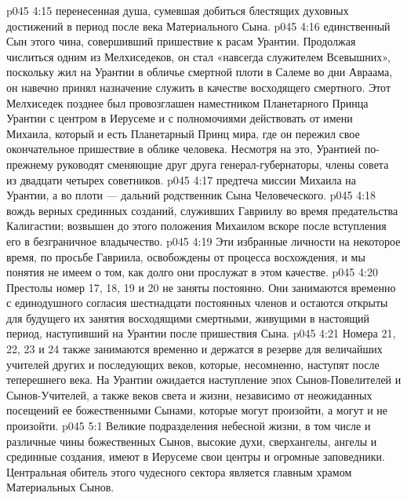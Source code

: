 \vs p045 4:15 \pc {}\bibnobreakspace {} перенесенная душа, сумевшая добиться блестящих духовных достижений в период после века Материального Сына.
\vs p045 4:16 \pc {}\bibnobreakspace {} единственный Сын этого чина, совершивший пришествие к расам Урантии. Продолжая числиться одним из Мелхиседеков, он стал «навсегда служителем Всевышних», поскольку жил на Урантии в обличье смертной плоти в Салеме во дни Авраама, он навечно принял назначение служить в качестве восходящего смертного. Этот Мелхиседек позднее был провозглашен наместником Планетарного Принца Урантии с центром в Иерусеме и с полномочиями действовать от имени Михаила, который и есть Планетарный Принц мира, где он пережил свое окончательное пришествие в облике человека. Несмотря на это, Урантией по\hyp{}прежнему руководят сменяющие друг друга генерал\hyp{}губернаторы, члены совета из двадцати четырех советников.
\vs p045 4:17 \pc {}\bibnobreakspace {} предтеча миссии Михаила на Урантии, а во плоти --- дальний родственник Сына Человеческого.
\vs p045 4:18 \pc {}\bibnobreakspace {} вождь верных срединных созданий, служивших Гавриилу во время предательства Калигастии; возвышен до этого положения Михаилом вскоре после вступления его в безграничное владычество.
\vs p045 4:19 \pc Эти избранные личности на некоторое время, по просьбе Гавриила, освобождены от процесса восхождения, и мы понятия не имеем о том, как долго они прослужат в этом качестве.
\vs p045 4:20 Престолы номер 17, 18, 19 и 20 не заняты постоянно. Они занимаются временно с единодушного согласия шестнадцати постоянных членов и остаются открыты для будущего их занятия восходящими смертными, живущими в настоящий период, наступивший на Урантии после пришествия Сына.
\vs p045 4:21 Номера 21, 22, 23 и 24 также занимаются временно и держатся в резерве для величайших учителей других и последующих веков, которые, несомненно, наступят после теперешнего века. На Урантии ожидается наступление эпох Сынов\hyp{}Повелителей и Сынов\hyp{}Учителей, а также веков света и жизни, независимо от неожиданных посещений ее божественными Сынами, которые могут произойти, а могут и не произойти.
\vs p045 5:1 Великие подразделения небесной жизни, в том числе и различные чины божественных Сынов, высокие духи, сверхангелы, ангелы и срединные создания, имеют в Иерусеме свои центры и огромные заповедники. Центральная обитель этого чудесного сектора является главным храмом Материальных Сынов.
